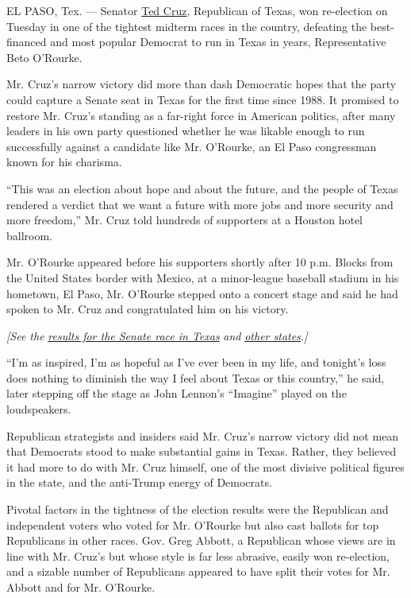 EL PASO, Tex. --- Senator
\href{https://www.nytimes.com/2020/07/13/us/politics/ted-cruz-wearing-no-mask.html}{Ted
Cruz}, Republican of Texas, won re-election on Tuesday in one of the
tightest midterm races in the country, defeating the best-financed and
most popular Democrat to run in Texas in years, Representative Beto
O'Rourke.

Mr. Cruz's narrow victory did more than dash Democratic hopes that the
party could capture a Senate seat in Texas for the first time since
1988. It promised to restore Mr. Cruz's standing as a far-right force in
American politics, after many leaders in his own party questioned
whether he was likable enough to run successfully against a candidate
like Mr. O'Rourke, an El Paso congressman known for his charisma.

``This was an election about hope and about the future, and the people
of Texas rendered a verdict that we want a future with more jobs and
more security and more freedom,'' Mr. Cruz told hundreds of supporters
at a Houston hotel ballroom.

Mr. O'Rourke appeared before his supporters shortly after 10 p.m. Blocks
from the United States border with Mexico, at a minor-league baseball
stadium in his hometown, El Paso, Mr. O'Rourke stepped onto a concert
stage and said he had spoken to Mr. Cruz and congratulated him on his
victory.

\emph{{[}See the}
\href{https://www.nytimes.com/elections/results/texas-senate?action=click\&module=Intentional\&pgtype=Article}{\emph{results
for the Senate race in Texas}} \emph{and}
\href{https://www.nytimes.com/interactive/2018/11/06/us/elections/results-senate-elections.html?action=click\&module=Intentional\&pgtype=Article}{\emph{other
states}}\emph{.{]}}

``I'm as inspired, I'm as hopeful as I've ever been in my life, and
tonight's loss does nothing to diminish the way I feel about Texas or
this country,'' he said, later stepping off the stage as John Lennon's
``Imagine'' played on the loudspeakers.

Republican strategists and insiders said Mr. Cruz's narrow victory did
not mean that Democrats stood to make substantial gains in Texas.
Rather, they believed it had more to do with Mr. Cruz himself, one of
the most divisive political figures in the state, and the anti-Trump
energy of Democrats.

Pivotal factors in the tightness of the election results were the
Republican and independent voters who voted for Mr. O'Rourke but also
cast ballots for top Republicans in other races. Gov. Greg Abbott, a
Republican whose views are in line with Mr. Cruz's but whose style is
far less abrasive, easily won re-election, and a sizable number of
Republicans appeared to have split their votes for Mr. Abbott and for
Mr. O'Rourke.

